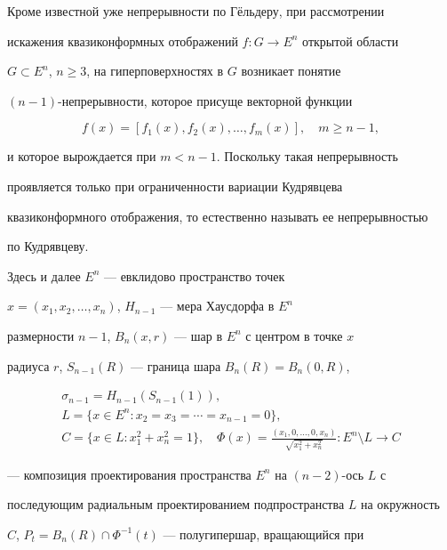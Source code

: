 \label{begin} 


 


Кроме известной уже непрерывности по Г\"ельдеру, при рассмотрении 


искажения квазиконформных отображений $f:G\to E^n$ открытой области 


$G\subset E^n$, $n\ge3$, на гиперповерхностях в $G$ возникает понятие 


$(n-1)$-непрерывности, которое присуще векторной функции 


$$ 


f(x)=[f_1(x),f_2(x),\dotsc,f_m(x)],\quad m\ge n-1, 


$$ 


и которое вырождается при $m<n-1$. Поскольку такая непрерывность 


проявляется только при ограниченности вариации Кудрявцева 


квазиконформного отображения, то естественно называть ее непрерывностью 


по Кудрявцеву. 


 


Здесь и далее $E^n$ --- евклидово пространство точек 


$x=(x_1,x_2,\dotsc,x_n)$, $H_{n-1}$ --- мера Хаусдорфа в $E^n$ 


размерности $n-1$, $B_n(x,r)$ --- шар в $E^n$ с центром в точке $x$ 


радиуса $r$, $S_{n-1}(R)$ --- граница шара $B_n(R)=B_n(0,R)$, 


\begin{gather*} 


\sigma_{n-1}=H_{n-1}(S_{n-1}(1)), \\ 


L=\{x\in E^n:x_2=x_3=\dotsb=x_{n-1}=0\},\\ 


C=\{x\in L:x^2_1+x^2_n=1\},\quad


\Phi(x)=\frac{(x_1,0,\dotsc,0,x_n)} 


{\sqrt{x^2_1+x^2_n}}:E^n\setminus L\to C 


\end{gather*} 


--- композиция проектирования пространства $E^n$ на $(n-2)$-ось $L$ с 


последующим радиальным проектированием подпространства $L$ на окружность 


$C$, $P_t=B_n(R)\cap\Phi^{-1}(t)$ --- полугипершар, вращающийся при 


